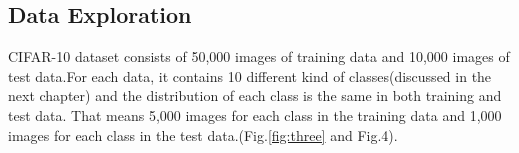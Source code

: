 \subsection{Data Exploration}


CIFAR-10 dataset consists of 50,000 images of training data and 10,000 images of test data.For each data, it contains 10 different kind of classes(discussed in the next chapter) and the distribution of each class is the same in both training and test data. That means 5,000 images for each class in the training data and 1,000 images for each class in the test data.(Fig.\ref{fig:three} and Fig.4). 

